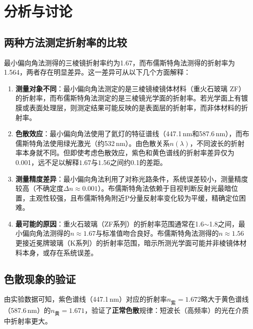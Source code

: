 \documentclass[UTF8]{article}
\begin{document}
\section{分析与讨论}

\subsection{两种方法测定折射率的比较}

最小偏向角法测得的三棱镜折射率约为1.67，而布儒斯特角法测得的折射率为1.564，两者存在明显差异。这一差异可从以下几个方面解释：

\begin{enumerate}
    \item \textbf{测量对象不同}：最小偏向角法测定的是三棱镜棱镜体材料（重火石玻璃 ZF）的折射率，而布儒斯特角法测定的是三棱镜光学面的折射率。若光学面上有镀膜或表面处理层，则测定结果可能反映的是表面层的折射率，而非体材料的折射率。
    
    \item \textbf{色散效应}：最小偏向角法使用了氦灯的特征谱线（447.1\,nm和587.6\,nm），而布儒斯特角法使用绿光激光（约532\,nm）。由色散关系$n(\lambda)$，不同波长的折射率本身就不同。但即使考虑色散效应，紫色和黄色谱线的折射率差异仅为0.001，远不足以解释$1.67$与$1.56$之间约0.1的差距。
    
    \item \textbf{测量精度差异}：最小偏向角法利用了对称光路条件，系统误差较小，测量精度较高（不确定度$\Delta n \approx 0.001$）。布儒斯特角法依赖于目视判断反射光最暗位置，主观性较强，且布儒斯特角附近P分量反射率变化较为平缓，精确定位困难。
    
    \item \textbf{最可能的原因}：重火石玻璃（ZF系列）的折射率范围通常在1.6$\sim$1.8之间，最小偏向角法测得的$n \approx 1.67$与标准值吻合良好。布儒斯特角法测得的$n \approx 1.56$更接近冕牌玻璃（K系列）的折射率范围，暗示所测光学面可能并非棱镜体材料本身，或存在系统误差。
\end{enumerate}

\subsection{色散现象的验证}

由实验数据可知，紫色谱线（447.1\,nm）对应的折射率$n_{\text{紫}} = 1.672$略大于黄色谱线（587.6\,nm）的$n_{\text{黄}} = 1.671$，验证了\textbf{正常色散}规律：短波长（高频率）的光在介质中折射率更大。
\end{document}
